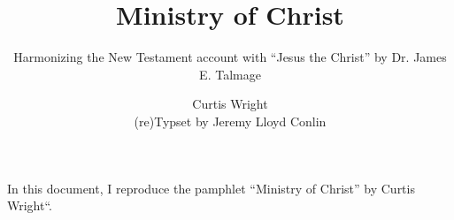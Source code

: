 \documentclass[8pt]{scrartcl}
\title{Ministry of Christ}
\subtitle{Harmonizing the New Testament account with ``Jesus the Christ'' by Dr. James E. Talmage}
\author{Curtis Wright\\\small (re)Typset by Jeremy Lloyd Conlin}
\begin{document}
\maketitle

In this document, I reproduce the pamphlet ``Ministry of Christ'' by Curtis Wright``.



\begin{comment}
\begin{longtable}[h]{lllW K E N}
    \toprule
    \multicolumn{1}{c}{Events} & \multicolumn{1}{c}{Locale} & Page & \multicolumn{1}{l}{Matthew} & \multicolumn{1}{l}{Mark} & \multicolumn{1}{l}{Luke} & \multicolumn{1}{l}{John} \\
    \midrule
\endhead
    \bottomrule
\endfoot
    \bottomrule
\endlastfoot
1:1 & 1:1 & 1:1 & 1:1 & 1:1 & 1:1 & 1:1 \\
1:2 & 1:2 & 1:2 & 1:2 & 1:2 & 1:2 & 1:2 \\
1:3 & 1:3 & 1:3 & 1:3 & 1:3 & 1:3 & 1:3 \\
\end{longtable}
\end{comment}
\end{document}
